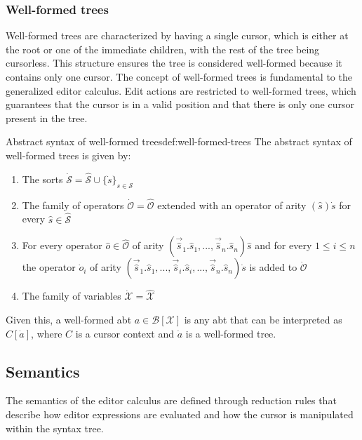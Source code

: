 \subsubsection{Well-formed trees}
\label{subsubsec:well-formed-trees}
Well-formed trees are characterized by having a single cursor, which is either at the root or one of the immediate children, with the rest of the tree being cursorless. This structure ensures the tree is considered well-formed because it contains only one cursor. The concept of well-formed trees is fundamental to the generalized editor calculus. Edit actions are restricted to well-formed trees, which guarantees that the cursor is in a valid position and that there is only one cursor present in the tree.

\begin{definition}{Abstract syntax of well-formed trees}{def:well-formed-trees}
    The abstract syntax of well-formed trees is given by:
    \begin{enumerate}
        \item The sorts $\dot{\mathcal{S}} = \hat{\mathcal{S}} \cup \{ \dot{s} \}_{s \in \mathcal{S}}$
        \item The family of operators $\dot{\mathcal{O}} = \hat{\mathcal{O}}$ extended with an operator of arity $(\hat{s})\dot{s}$ for every $\hat{s} \in \hat{\mathcal{S}}$
        \item For every operator $\hat{o} \in \hat{\mathcal{O}}$ of arity $(\vec{\hat{s}}_1.\hat{s}_1,...,\vec{\hat{s}}_n.\hat{s}_n)\hat{s}$ and for every $1 \leq i \leq n$ the operator $\dot{o}_i$ of arity $(\vec{\hat{s}}_1.\hat{s}_1,...,\vec{\hat{s}}_i.\hat{s}_i,...,\vec{\hat{s}}_n.\hat{s}_n)\dot{s}$ is added to $\dot{\mathcal{O}}$
        \item The family of variables $\dot{\mathcal{X}} = \hat{\mathcal{X}}$
    \end{enumerate}
\end{definition}

Given this, a well-formed abt $a \in \mathcal{B[\mathcal{X}]}$ is any abt that
can be interpreted as $C[\dot{a}]$, where $C$ is a cursor context and $\dot{a}$ is a well-formed tree.

\subsection{Semantics}
The semantics of the editor calculus are defined through reduction rules that describe how editor expressions are evaluated and how the cursor is manipulated within the syntax tree.

